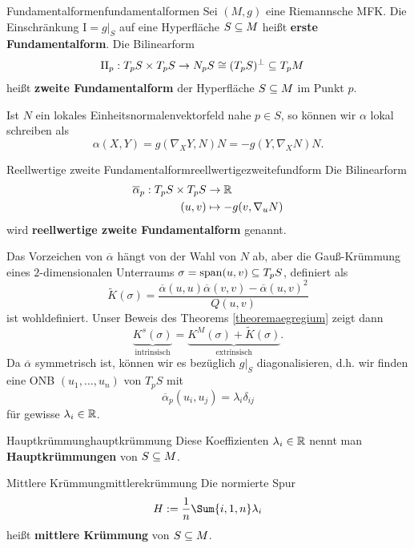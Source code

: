 \begin{definition}{Fundamentalformen}{fundamentalformen}
Sei $(M,g)$ eine Riemannsche MFK. Die Einschränkung $\text{I}=g|_S$ auf eine Hyperfläche $S \subseteq M$ heißt \textbf{erste Fundamentalform}.
Die Bilinearform
\begin{align}
\text{II}_p: T_pS \times T_p S &\to N_pS \cong (T_pS)^{\perp} \subseteq T_pM
\end{align}
heißt \textbf{zweite Fundamentalform} der Hyperfläche $S \subseteq M$ im Punkt $p$.
\end{definition}
Ist $N$ ein lokales Einheitsnormalenvektorfeld nahe $p \in S$, so können wir $\alpha$ lokal schreiben als
\begin{equation}
\alpha(X,Y)=g(\nabla_XY,N)N=-g(Y,\nabla_XN)N.
\end{equation}
\begin{definition}{Reellwertige zweite Fundamentalform}{reellwertigezweitefundform}
Die Bilinearform
\begin{align}
\overline{\alpha}_p: T_pS \times T_pS &\to \mathbb{R}\\
(u,v) &\mapsto -g(v, \nabla_uN)
\end{align}
wird \textbf{reellwertige zweite Fundamentalform} genannt.
\end{definition}
Das Vorzeichen von $\overline{\alpha}$ hängt von der Wahl von $N$ ab, aber die Gauß-Krümmung eines $2$-dimensionalen Unterraums $\sigma = \spn (u,v) \sub T_pS$, definiert als
\begin{equation}
\tilde{K}(\sigma) = \frac{\overline{\alpha}(u,u)\overline{\alpha}(v,v)-\overline{\alpha}(u,v)^2}{Q(u,v)}
\end{equation}
ist wohldefiniert. Unser Beweis des Theorems \ref{theoremaegregium} zeigt dann
\begin{equation}
\underbrace{K^s(\sigma)}_\text{intrinsisch} = \underbrace{K^M(\sigma) + \tilde{K}(\sigma)}_\text{extrinsisch}.
\end{equation}
Da $\overline{\alpha}$ symmetrisch ist, können wir es bezüglich $g|_S$ diagonalisieren, d.h. wir finden eine ONB $(u_1, \dots, u_n)$ von $T_pS$ mit
\begin{equation}
\overline{\alpha}_p(u_i,u_j)=\lambda_i \delta_{ij}
\end{equation}
für gewisse $\lambda_i \in \mathbb{R}$.
\begin{definition}{Hauptkrümmung}{hauptkrümmung}
Diese Koeffizienten $\lambda_i \in \mathbb{R}$ nennt man \textbf{Hauptkrümmungen} von $S \subseteq M$.
\end{definition}
\begin{definition}{Mittlere Krümmung}{mittlerekrümmung}
Die normierte Spur
\begin{equation}
H:=\frac{1}{n} \Sum{i,1,n} \lambda_i
\end{equation}
heißt \textbf{mittlere Krümmung} von $S \subseteq M$.
\end{definition}
